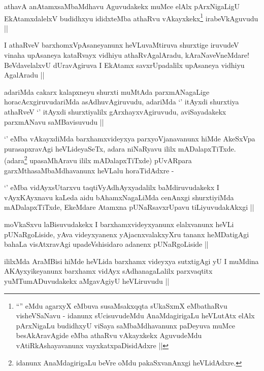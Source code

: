 \begin{artha}
athavA anAtamxsaMbaMdhavu Aguvudakekx muMce elAlx pArxNigaLigU
EkAtamxdalelxV budidhxyu ididxteMba athaRvu
vAkayxkekx\footnote[2]{``\stext'' eMdu agarxyX eMbuva susaMsakxqqta
  sUkaSxmX eMbathaRvu visheVSaNavu - idanunx sUcisuvudeMdu
  AnaMdagirigaLu heVLutAtx elAlx pArxNigaLu budidhxyU viSaya
  saMbaMdhavanunx paDeyuva muMce besAkAravAgide eMba athaRvu
  vAkayxkekx AguvudeMdu vAtiRkAshayavanunx vayxkatxpaDisidAdxre ||} irabeVkAguvudu ||
\end{artha}

\begin{artha}
I athaRveV barxhomxVpAsaneyanunx heVLuvaMtiruva shurxtige iruvudeV
vinaha upAsaneya kataRvayx vidhiyu athaRvAgalAradu, kAraNaveVneMdare!
BeVdavelalxvU dUravAgiruva I EkAtamx savxrUpadalilx upAsaneya vidhiyu
AgalAradu ||
\end{artha}

\begin{artha}
adariMda cakarx kalapxneyu shurxti muMtAda parxmANagaLige
horacAcxgiruvudariMda asAdhuvAgiruvudu, adariMda `\stext' itAyxdi
shurxtiya athaRveV `\stext' itAyxdi shurxtiyalilx gArxhayxvAgiruvudu,
aviSayadakekx parxmANavu saMBavisuvudu ||
\end{artha}

\begin{artha}
`\stext' eMba vAkayxdiMda barxhamxvideyxya parxyoVjanavanunx hiMde
  AkeSxVpa purasapxravAgi heVLideyaSeTx, adara niNaRyavu ililx
  mADalapxTiTxde. (adara\footnote[1]{idanunx AnaMdagirigaLu beVre oMdu
  pakaSxvanAnxgi heVLidAdxre.} upasaMhAravu ililx
  mADalapxTiTxde) pUvARpara garxMthasaMbaMdhavanunx heVLalu
  horaTidAdxre -
\end{artha}

\begin{artha}
`\stext' eMba vidAyxsUtarxvu taqtiVyAdhAyxyadalilx baMdiruvudakekx I
  vAyxKAyxnavu kaLeda aidu bAhamxNagaLiMda cenAnxgi shurxtiyiMda
  mADalapxTiTxde, EkeMdare Atamxna pUNaRsavxrUpavu tiLiyuvudakAkxgi ||
\end{artha}

\begin{artha}
moVkaSxvu laBisuvudakekx I barxhamxvideyxyanunx elalxvanunx heVLi
pUNaRgoLiside, yAva videyxyanenx yAjacnxvalakxyXru tananx heMDatigAgi
bahaLa visAtxravAgi upadeVshisidaro adanenx pUNaRgoLiside ||
\end{artha}

\begin{artha}
ililxMda AraMBisi hiMde heVLida barxhamx videyxya sutxtigAgi yU I
muMdina AKAyxyikeyanunx barxhamx vidAyx sAdhanagaLalilx parxvaqtitx
yuMTumADuvudakekx aMgavAgiyU heVLiruvudu ||
\end{artha}

